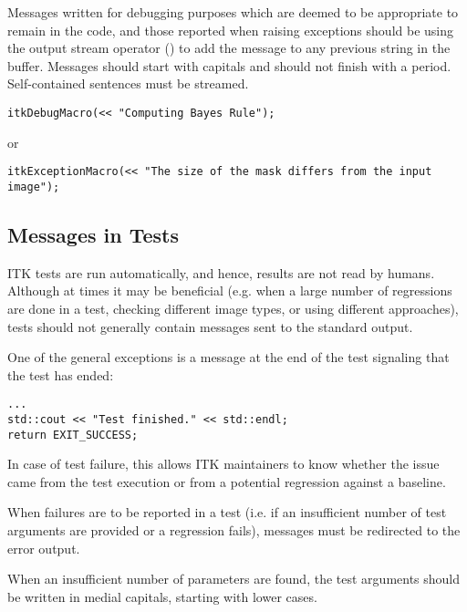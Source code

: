 Messages written for debugging purposes which are deemed to be appropriate to
remain in the code, and those reported when raising exceptions should be using
the output stream operator (\code{<<}) to add the message to any previous string
in the buffer. Messages should start with capitals and should not finish with a
period. Self-contained sentences must be streamed.

\small
\begin{verbatim}
itkDebugMacro(<< "Computing Bayes Rule");
\end{verbatim}
\normalsize

or

\small
\begin{verbatim}
itkExceptionMacro(<< "The size of the mask differs from the input image");
\end{verbatim}
\normalsize


\subsection{Messages in Tests}
\label{subsec:MessagesInTests}

ITK tests are run automatically, and hence, results are not read by humans.
Although at times it may be beneficial (e.g. when a large number of regressions
are done in a test, checking different image types, or using different
approaches), tests should not generally contain messages sent to the standard
output.

One of the general exceptions is a message at the end of the test signaling
that the test has ended:

\small
\begin{verbatim}
...
std::cout << "Test finished." << std::endl;
return EXIT_SUCCESS;
\end{verbatim}
\normalsize

In case of test failure, this allows ITK maintainers to know whether the issue
came from the test execution or from a potential regression against a baseline.

When failures are to be reported in a test (i.e. if an insufficient number of
test arguments are provided or a regression fails), messages must be redirected
to the error output.

When an insufficient number of parameters are found, the test arguments should
be written in medial capitals, starting with lower cases.

